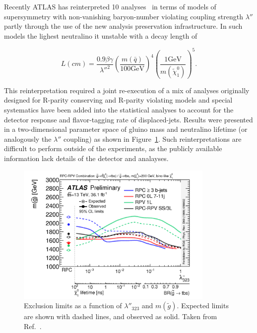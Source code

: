 
Recently ATLAS has reinterpreted 10 analyses~\cite{ATLAS:2018yey} in terms of models of supersymmetry with non-vanishing baryon-number violating coupling strength $\lambda''$ partly through the use of the new analysis preservation infrastructure. In such models the lighest neutralino it unstable with a decay length of 

\begin{equation}
  L(cm) = \frac{0.9\beta\gamma}{{\lambda''}^2} \left(\frac{m(\bar{q})}{100\mathrm{GeV}}\right)^4\left(\frac{1\mathrm{GeV}}{m(\tilde{\chi}_1^0)}\right)^5.
\end{equation}

This reinterpretation required a joint re-execution of a mix of analyses originally designed for R-parity conserving and R-parity violating models and special systematics have been added into the statistical analyses to account for the detector response and flavor-tagging rate of displaced-jets. Results were presented in a two-dimensional parameter space of gluino mass and neutralino lifetime (or analogously the $\lambda''$ coupling) as shown in Figure~\ref{fig:rpvrpc}. Such reinterpretations are difficult to perform outside of the experiments, as the publicly available information lack details of the detector and analayses.

\begin{figure}[h]
\begin{center}
\includegraphics[width=0.85\textwidth,angle=0]{ch5-figures/fig_04.png}
\end{center}
\caption{Exclusion limits as a function of $\lambda''_{323}$ and $m({\tilde{g}})$. Expected limits are shown with dashed lines, and observed as solid. Taken from Ref.~\cite{ATLAS:2018yey}.}
\label{fig:rpvrpc}
\end{figure}




